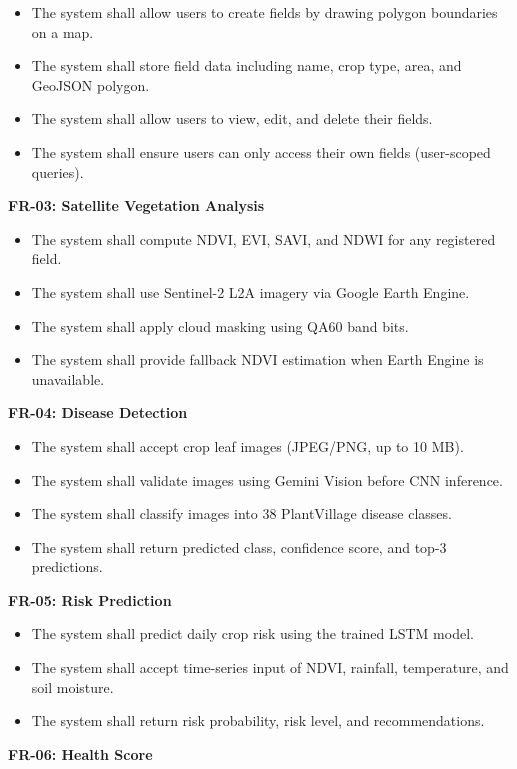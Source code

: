 \documentclass[12pt, a4paper]{report}
\begin{document}
\begin{itemize}[leftmargin=*]
  \item The system shall allow users to create fields by drawing polygon boundaries on a map.
  \item The system shall store field data including name, crop type, area, and GeoJSON polygon.
  \item The system shall allow users to view, edit, and delete their fields.
  \item The system shall ensure users can only access their own fields (user-scoped queries).
\end{itemize}
\textbf{FR-03: Satellite Vegetation Analysis}

\begin{itemize}[leftmargin=*]
  \item The system shall compute NDVI, EVI, SAVI, and NDWI for any registered field.
  \item The system shall use Sentinel-2 L2A imagery via Google Earth Engine.
  \item The system shall apply cloud masking using QA60 band bits.
  \item The system shall provide fallback NDVI estimation when Earth Engine is unavailable.
\end{itemize}
\textbf{FR-04: Disease Detection}

\begin{itemize}[leftmargin=*]
  \item The system shall accept crop leaf images (JPEG/PNG, up to 10 MB).
  \item The system shall validate images using Gemini Vision before CNN inference.
  \item The system shall classify images into 38 PlantVillage disease classes.
  \item The system shall return predicted class, confidence score, and top-3 predictions.
\end{itemize}
\textbf{FR-05: Risk Prediction}

\begin{itemize}[leftmargin=*]
  \item The system shall predict daily crop risk using the trained LSTM model.
  \item The system shall accept time-series input of NDVI, rainfall, temperature, and soil moisture.
  \item The system shall return risk probability, risk level, and recommendations.
\end{itemize}
\textbf{FR-06: Health Score}
\end{document}
